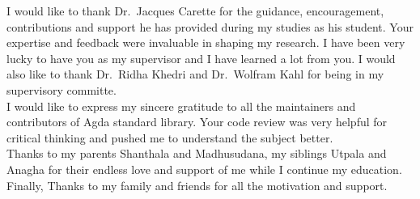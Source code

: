 
I would like to thank Dr.\  Jacques Carette for the guidance, encouragement,
contributions and support he has provided during my studies as his student. Your
expertise and feedback were invaluable in shaping my research. I have been very
lucky to have you as my supervisor and I have learned a lot from you. I would
also like to thank Dr.\  Ridha Khedri and Dr.\ Wolfram Kahl for being in my
supervisory committe.\\

I would like to express my sincere gratitude to all the maintainers and
contributors of Agda standard library. Your code review was very helpful for
critical thinking and pushed me to understand the subject better. \\

Thanks to my parents Shanthala and Madhusudana, my siblings Utpala and Anagha
for their endless love and support of me while I continue my education. Finally,
Thanks to my family and friends for all the motivation and support.